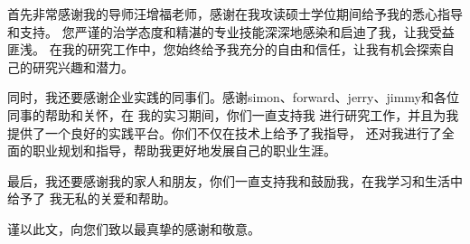 
\begin{acknowledgements}

首先非常感谢我的导师汪增福老师，感谢在我攻读硕士学位期间给予我的悉心指导和支持。
您严谨的治学态度和精湛的专业技能深深地感染和启迪了我，让我受益匪浅。
在我的研究工作中，您始终给予我充分的自由和信任，让我有机会探索自己的研究兴趣和潜力。

同时，我还要感谢企业实践的同事们。感谢simon、forward、jerry、jimmy和各位同事的帮助和关怀，在
我的实习期间，你们一直支持我
进行研究工作，并且为我提供了一个良好的实践平台。你们不仅在技术上给予了我指导，
还对我进行了全面的职业规划和指导，帮助我更好地发展自己的职业生涯。

最后，我还要感谢我的家人和朋友，你们一直支持我和鼓励我，在我学习和生活中给予了
我无私的关爱和帮助。

谨以此文，向您们致以最真挚的感谢和敬意。

\end{acknowledgements}
